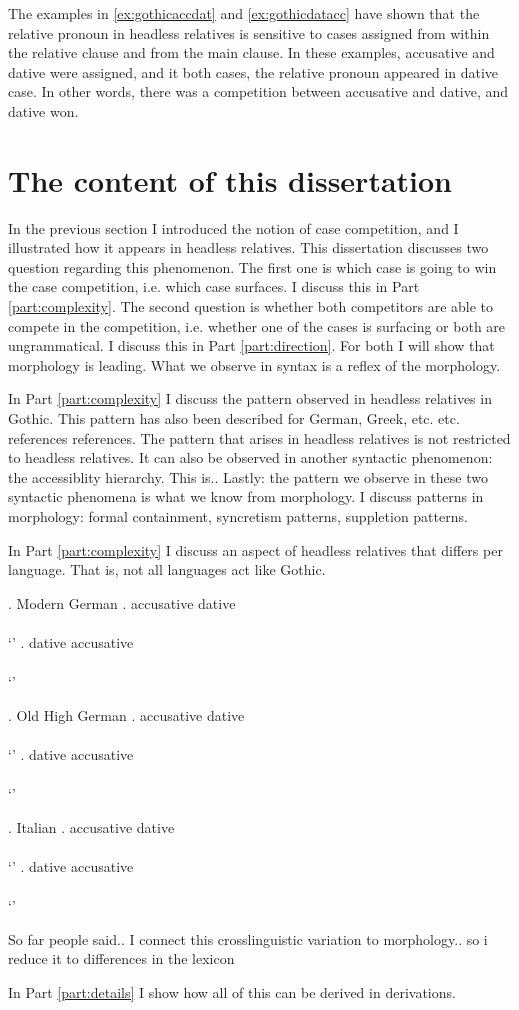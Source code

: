 The examples in \ref{ex:gothicaccdat} and \ref{ex:gothicdatacc} have shown that the relative pronoun in headless relatives is sensitive to cases assigned from within the relative clause and from the main clause. In these examples, accusative and dative were assigned, and it both cases, the relative pronoun appeared in dative case. In other words, there was a competition between accusative and dative, and dative won.



\section{The content of this dissertation}

In the previous section I introduced the notion of case competition, and I illustrated how it appears in headless relatives. This dissertation discusses two question regarding this phenomenon.
The first one is which case is going to win the case competition, i.e. which case surfaces. I discuss this in Part \ref{part:complexity}.
The second question is whether both competitors are able to compete in the competition, i.e. whether one of the cases is surfacing or both are ungrammatical. I discuss this in Part \ref{part:direction}.
For both I will show that morphology is leading. What we observe in syntax is a reflex of the morphology.

In Part \ref{part:complexity} I discuss the pattern observed in headless relatives in Gothic. This pattern has also been described for German, Greek, etc. etc. references references.
The pattern that arises in headless relatives is not restricted to headless relatives. It can also be observed in another syntactic phenomenon: the accessiblity hierarchy. This is..
Lastly: the pattern we observe in these two syntactic phenomena is what we know from morphology. I discuss patterns in morphology: formal containment, syncretism patterns, suppletion patterns.

In Part \ref{part:complexity} I discuss an aspect of headless relatives that differs per language. That is, not all languages act like Gothic.

\ex. Modern German
\ag. accusative dative\\
 \\
 `'
\bg. dative accusative\\
 \\
 `'

 \ex. Old High German
 \ag. accusative dative\\
  \\
  `'
 \bg. dative accusative\\
  \\
  `'

  \ex. Italian
  \ag. accusative dative\\
   \\
   `'
  \bg. dative accusative\\
   \\
   `'

So far people said..
I connect this crosslinguistic variation to morphology.. so i reduce it to differences in the lexicon

In Part \ref{part:details} I show how all of this can be derived in derivations.
